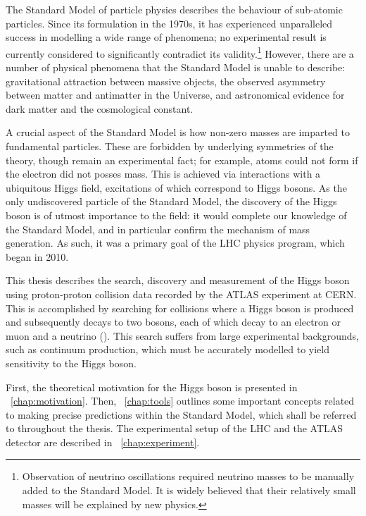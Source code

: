 
The Standard Model of particle physics describes the behaviour of sub-atomic particles. 
Since its formulation in the 1970s, it has experienced unparalleled success in modelling a 
wide range of phenomena; no experimental result is currently considered to significantly 
contradict its validity.\footnote{
	Observation of neutrino oscillations required neutrino masses to be manually added to 
	the Standard Model. It is widely believed that their relatively small masses will be 
	explained by new physics.
}
However, there are a number of physical phenomena that the Standard Model is unable to 
describe: gravitational attraction between massive objects, the observed asymmetry between 
matter and antimatter in the Universe, and astronomical evidence for dark matter and the 
cosmological constant.

A crucial aspect of the Standard Model is how non-zero masses are imparted to fundamental 
particles. These are forbidden by underlying symmetries of the theory, though remain an 
experimental fact; for example, atoms could not form if the electron did not posses mass.
This is achieved via interactions with a ubiquitous Higgs field, excitations of which 
correspond to Higgs bosons. As the only undiscovered particle of the Standard Model, the 
discovery of the Higgs boson is of utmost importance to the field: it would complete our 
knowledge of the Standard Model, and in particular confirm the mechanism of mass generation. 
As such, it was a primary goal of the LHC physics program, which began in 2010.

This thesis describes the search, discovery and measurement of the Higgs boson using 
proton-proton collision data recorded by the ATLAS experiment at CERN. This is accomplished 
by searching for collisions where a Higgs boson is produced and subsequently decays to two 
\PW bosons, each of which decay to an electron or muon and a neutrino (\ie \HWWlvlv). This 
search suffers from large experimental backgrounds, such as continuum \WW production, which 
must be accurately modelled to yield sensitivity to the Higgs boson.

First, the theoretical motivation for the Higgs boson is presented in 
\Chapter~\ref{chap:motivation}. Then, \Chapter~\ref{chap:tools} outlines some important 
concepts related to making precise predictions within the Standard Model, which shall be 
referred to throughout the thesis. The experimental setup of the LHC and the ATLAS detector 
are described in \Chapter~\ref{chap:experiment}.

